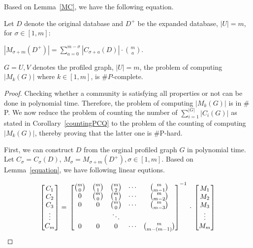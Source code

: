 Based on Lemma~\ref{MC}, we have the following equation.

\begin{lemma}
\label{equation}
Let $D$ denote the original database and $D^+$ be the expanded database, $|U|=m$, for $\sigma \in [1,m]$:

$|M_{\sigma +m}(D^+)| = \displaystyle{\sum_{a=0}^{m-\sigma}}|C_{\sigma +a}(D)| \cdot \binom{m}{a}$.
\end{lemma}

\begin{theorem}
$G={U,V}$ denotes the profiled graph, $|U|=m$, the problem of computing $|M_k(G)|$ where $k \in [1,m]$, is $\#P$-complete.
\end{theorem}


\begin{proof}
Checking whether a community is satisfying all properties or not can be done in polynomial time. Therefore, the problem of computing $|M_k(G)|$ is in $\#$P. We now reduce the problem of counting the number of $\sum_{i=1}^{|G|}{|C_i(G)|}$ as stated in Corollary~\ref{countingPCQ} to the problem of the counting of computing $|M_k(G)|$, thereby proving that the latter one is $\#$P-hard.

First, we can construct $D$ from the orginal profiled graph $G$ in polynomial time. Let $C_\sigma =C_{\sigma}(D)$, $M_\sigma=M_{\sigma+m}(D^+), \sigma \in [1,m]$. Based on Lemma~\ref{equation}, we have following linear equtions. 

$$
\left[
\begin{matrix}
C_1 \\ C_2 \\C_3 \\\vdots\\ C_m
\end{matrix}
\right]=\\
\left[
\begin{matrix}
 \binom{m}{0}  & \binom{m}{1} & \binom{m}{2} & \cdots & \binom{m}{m-1}     \\
 0 			   & \binom{m}{0} & \binom{m}{1} & \cdots & \binom{m}{m-2}     \\
 0 			   & 0            & \binom{m}{0} & \cdots & \binom{m}{m-3}     \\
 			   & 			  &				   \ddots				   	   \\
 0 			   & 0            & 0			 & \cdots & \binom{m}{m-(m-1)} \\
\end{matrix}
\right]^{-1} \\
\cdot \\
\left[
\begin{matrix}
M_1 \\ M_2 \\M_3 \\\vdots\\ M_m
\end{matrix}
\right]
$$



\end{proof}
